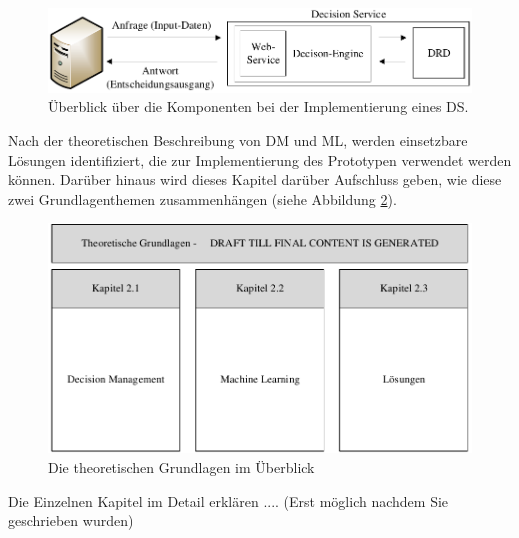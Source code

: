 \begin{figure}[ht]
\centering
\includegraphics{images/decisionservice.pdf}
\caption{Überblick über die Komponenten bei der Implementierung eines DS.}
\label{fig:decisionservice}
\end{figure} 

Nach der theoretischen Beschreibung von DM und ML, werden einsetzbare Lösungen identifiziert,  die zur Implementierung des Prototypen verwendet werden können. Darüber hinaus wird dieses Kapitel darüber Aufschluss geben, wie diese zwei Grundlagenthemen zusammenhängen (siehe Abbildung \ref{fig:Grundlagenpic}).     

\begin{figure}[ht]
\centering
\includegraphics{images/grundlagentheo.pdf}
\caption{Die theoretischen Grundlagen im Überblick}
\label{fig:Grundlagenpic}
\end{figure}

Die Einzelnen Kapitel im Detail erklären .... (Erst möglich nachdem Sie geschrieben wurden)